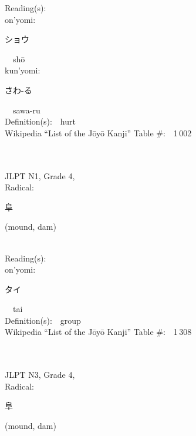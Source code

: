 \begin{multicols}{2}
Reading(s):\ \ \\
{\hspace*{1em}}on'yomi:\ \ \\
{\hspace*{2em}}{\begin{CJK}{UTF8}{min} ショウ \end{CJK}}\ \ sh\=o\ \ \\
{\hspace*{1em}}kun'yomi:\ \ \\
{\hspace*{2em}}{\begin{CJK}{UTF8}{min} さわ-る \end{CJK}}\ \ sawa-ru\ \ \\
Definition(s):\ \ hurt \\
Wikipedia ``List of the J\=oy\=o Kanji'' Table \#:\ \ 1\,002 \\
\ \ \\
{\fontsize{34pt}{40pt}  }\ \ \\  %
{JLPT N1, Grade 4, \\Radical:\ \ {\begin{CJK}{UTF8}{min} 阜 \end{CJK}} (mound, dam) } \\
Reading(s):\ \ \\
{\hspace*{1em}}on'yomi:\ \ \\
{\hspace*{2em}}{\begin{CJK}{UTF8}{min} タイ \end{CJK}}\ \ tai\ \ \\
Definition(s):\ \ group \\
Wikipedia ``List of the J\=oy\=o Kanji'' Table \#:\ \ 1\,308 \\
\ \ \\
{\fontsize{34pt}{40pt}  }\ \ \\  %
{JLPT N3, Grade 4, \\Radical:\ \ {\begin{CJK}{UTF8}{min} 阜 \end{CJK}} (mound, dam) } \\

\end{multicols}
